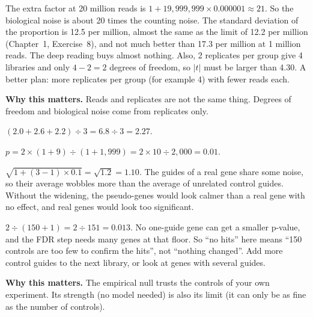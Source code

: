 \documentclass[12pt]{article}
\newcommand{\why}[1]{\par\smallskip\noindent\textcolor{barcsgreen!70!black}{\textbf{Why this matters.}} #1}
\begin{document}
\begin{exlist}[resume]
\item The extra factor at 20 million reads is $1 + 19{,}999{,}999 \times
0.000001 \approx 21$. So the biological noise is about 20 times the counting
noise. The standard deviation of the proportion is 12.5 per million,
almost the same as the limit of 12.2 per million (Chapter~1, Exercise~8),
and not much better than 17.3 per million at 1 million reads. The deep
reading buys almost nothing. Also, 2 replicates per group give 4 libraries
and only $4 - 2 = 2$ degrees of freedom, so $|t|$ must be larger than 4.30.
A better plan: more replicates per group (for example 4) with fewer reads
each.
\why{Reads and replicates are not the same thing. Degrees of freedom and
biological noise come from replicates only.}

\item
\begin{parts}
\item $(2.0 + 2.6 + 2.2) \div 3 = 6.8 \div 3 = 2.27$.
\item $p = 2 \times (1 + 9) \div (1 + 1{,}999) = 2 \times 10 \div 2{,}000 =
  0.01$.
\item $\sqrt{1 + (3 - 1) \times 0.1} = \sqrt{1.2} = 1.10$. The guides of a
  real gene share some noise, so their average wobbles more than the
  average of unrelated control guides. Without the widening, the
  pseudo-genes would look calmer than a real gene with no effect, and real
  genes would look too significant.
\item $2 \div (150 + 1) = 2 \div 151 = 0.013$. No one-guide gene can get a
  smaller p-value, and the FDR step needs many genes at that floor. So
  ``no hits'' here means ``150 controls are too few to confirm the hits'',
  not ``nothing changed''. Add more control guides to the next library, or
  look at genes with several guides.
\end{parts}
\why{The empirical null trusts the controls of your own experiment. Its
strength (no model needed) is also its limit (it can only be as fine as the
number of controls).}
\end{exlist}
\end{document}
